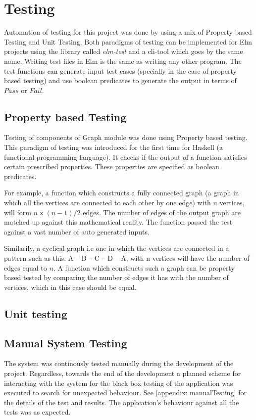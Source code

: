 
\section{Testing}

Automation of testing for this project was done by using a mix of Property
based Testing and Unit Testing. Both paradigms of testing can be implemented
for Elm projects using the library called \emph{elm-test} and a cli-tool which
goes by the same name. Writing test files in Elm is the same as writing any
other program. The test functions can generate input test cases (specially in
the case of property based testing) and use boolean predicates to generate the
output in terms of $Pass$ or $Fail$.

\subsection{Property based Testing}
Testing of components of Graph module was done using Property based testing.
This paradigm of testing was introduced for the first time for Haskell (a
functional programming language). It checks if the output of a function
satisfies certain prescribed properties. These properties are specified as
boolean predicates.

For example, a function which constructs a fully connected graph (a graph in
which all the vertices are connected to each other by one edge) with $n$
vertices, will form $n \times (n - 1) / 2$ edges. The number of edges of the output
graph are matched up against this mathematical reality. The function passed
the test against a vast number of auto generated inputs.

Similarily, a cyclical graph i.e one in which the vertices are connected in a
pattern such as this: A -- B -- C -- D -- A, with n vertices will have the
number of edges equal to $n$. A function which constructs such a graph can be
property based tested by comparing the number of edges it has with the number
of vertices, which in this case should be equal.

\subsection{Unit testing}

\subsection{Manual System Testing}
The system was continously tested manually during the development of the
project. Regardless, towards the end of the development a planned scheme for
interacting with the system for the black box testing of the application was
executed to search for unexpected behaviour. See \autoref{appendix:
manualTesting} for the details of the test and results. The application's
behaviour against all the tests was as expected.
